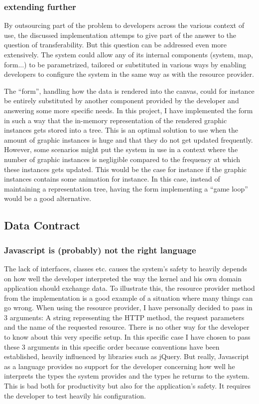 \subsubsection{extending further}
By outsourcing part of the problem to developers across the various context of use, the discussed implementation attemps to give part of the answer to the question of transferability. But this question can be addressed even more extensively. The system could allow any of its internal components (system, map, form...) to be parametrized, tailored or substituted in various ways by enabling developers to configure the system in the same way as with the resource provider.

The ``form'', handling how the data is rendered into the canvas, could for instance be entirely substituted by another component provided by the developer and answering some more specific needs. In this project, I have implemented the form in such a way that the in-memory representation of the rendered graphic instances gets stored into a tree. This is an optimal solution to use when the amount of graphic instances is huge and that they do not get updated frequently. However, some scenarios might put the system in use in a context where the number of graphic instances is negligible compared to the frequency at which these instances gets updated. This would be the case for instance if the graphic instances contains some animation for instance. In this case, instead of maintaining a representation tree, having the form implementing a ``game loop'' would be a good alternative.

\subsection{Data Contract}


\subsubsection{Javascript is (probably) not the right language}

The lack of interfaces, classes etc. causes the system's safety to heavily depends on how well the developer interpreted the way the kernel and his own domain application should exchange data. To illustrate this, the resource provider method from the implementation is a good example of a situation where many things can go wrong. When using the resource provider, I have personally decided to pass in 3 arguments: A string representing the HTTP method, the request parameters and the name of the requested resource. There is no other way for the developer to know about this very specific setup. In this specific case I have chosen to pass these 3 arguments in this specific order because conventions have been established, heavily influenced by libraries such as jQuery. But really, Javascript as a language provides no support for the developer concerning how well he interprets the types the system provides and the types he returns to the system. This is bad both for productivity but also for the application's safety. It requires the developer to test heavily his configuration.

